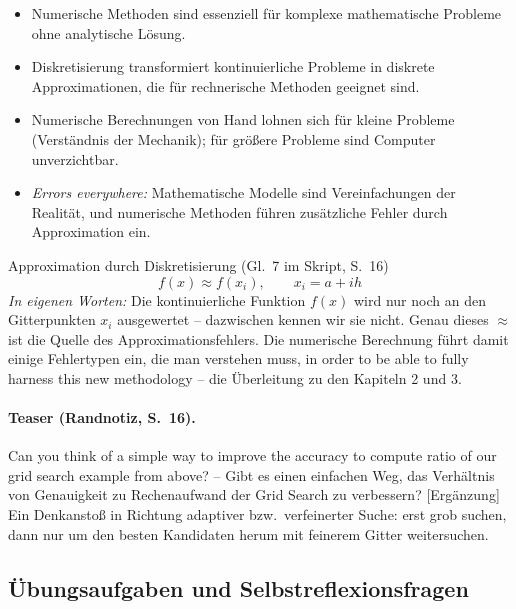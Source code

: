 \begin{itemize}[itemsep=1pt]
  \item Numerische Methoden sind essenziell für komplexe mathematische Probleme ohne analytische Lösung.
  \item Diskretisierung transformiert kontinuierliche Probleme in diskrete Approximationen, die für rechnerische Methoden geeignet sind.
  \item Numerische Berechnungen von Hand lohnen sich für kleine Probleme (Verständnis der Mechanik); für größere Probleme sind Computer unverzichtbar.
  \item \emph{Errors everywhere:} Mathematische Modelle sind Vereinfachungen der Realität, und numerische Methoden führen zusätzliche Fehler durch Approximation ein.
\end{itemize}

\begin{satzbox}{Approximation durch Diskretisierung (Gl.~7 im Skript, S.~16)}
\[
f(x) \approx f(x_i), \qquad x_i = a + ih
\]
\emph{In eigenen Worten:} Die kontinuierliche Funktion $f(x)$ wird nur noch an den Gitterpunkten $x_i$ ausgewertet -- dazwischen kennen wir sie nicht. Genau dieses \glqq$\approx$\grqq{} ist die Quelle des Approximationsfehlers. Die numerische Berechnung führt damit einige Fehlertypen ein, die man verstehen muss, \glqq in order to be able to fully harness this new methodology\grqq{} -- die Überleitung zu den Kapiteln 2 und 3.
\end{satzbox}

\paragraph{Teaser (Randnotiz, S.~16).} \glqq Can you think of a simple way to improve the accuracy to compute ratio of our grid search example from above?\grqq{} -- Gibt es einen einfachen Weg, das Verhältnis von Genauigkeit zu Rechenaufwand der Grid Search zu verbessern? [Ergänzung] Ein Denkanstoß in Richtung adaptiver bzw.\ verfeinerter Suche: erst grob suchen, dann nur um den besten Kandidaten herum mit feinerem Gitter weitersuchen.

\subsection{Übungsaufgaben und Selbstreflexionsfragen}

